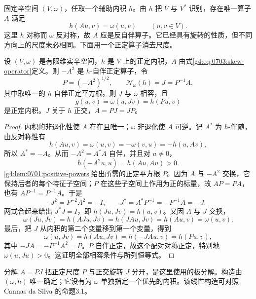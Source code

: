 固定辛空间 \((V,\omega)\)，任取一个辅助内积 \(h\)。由 \(h\) 把 \(V\) 与 \(V^*\) 识别，存在唯一算子 \(A\) 满足
\begin{equation}\label{g4:eq:0703:skew-operator}
	h(Au,v)=\omega(u,v)\qquad(u,v\in V).
\end{equation}
这里 \(h\) 对称而 \(\omega\) 反对称，故 \(A\) 应是反自伴算子。它已经具有旋转的性质，但不同方向上的尺度未必相同。下面用一个正定算子消去尺度。

\begin{theorem}\label{g4:thm:0703:polar-construction}
	设 \((V,\omega)\) 是有限维实辛空间，\(h\) 是 \(V\) 上的正定内积，\(A\) 由式\eqref{g4:eq:0703:skew-operator}定义。则 \(-A^2\) 是 \(h\)-自伴正定算子，令
	\begin{equation}\label{g4:eq:0703:normalization}
		P=(-A^2)^{1/2},\qquad
		\mathcal N_\omega(h)=J=P^{-1}A,
	\end{equation}
	其中取唯一的 \(h\)-自伴正定平方根。则 \(J\) 与 \(\omega\) 相容，且
	\begin{equation}\label{g4:eq:0703:normalized-metric}
		g(u,v)=\omega(u,Jv)=h(Pu,v)
	\end{equation}
	是正定内积。\(J\) 关于 \(h\) 正交，\(A=PJ=JP\)。
\end{theorem}
\begin{proof}
	内积的非退化性使 \(A\) 存在且唯一；\(\omega\) 非退化使 \(A\) 可逆。记 \(A^*\) 为 \(h\)-伴随，由反对称性有
	\[
		h(Au,v)=\omega(u,v)=-\omega(v,u)=-h(u,Av),
	\]
	所以 \(A^*=-A\)。从而 \(-A^2=A^*A\) 自伴，并且对 \(u\ne0\)，
	\[
		h(-A^2u,u)=h(Au,Au)>0.
	\]
	\cref{g4:lem:0701:positive-powers}给出所需的正定平方根 \(P\)。因为 \(A\) 与 \(-A^2\) 交换，它保持后者的每个特征子空间；\(P\) 在这些子空间上作用为正的标量，故 \(AP=PA\)，也有 \(AP^{-1}=P^{-1}A\)。于是
	\[
		J^2=P^{-2}A^2=-I,
		\qquad J^*=A^*P^{-1}=-P^{-1}A=-J.
	\]
	两式合起来给出 \(J^*J=I\)，即 \(h(Ju,Jv)=h(u,v)\)。又因 \(A\) 与 \(J\) 交换，
	\[
		\omega(Ju,Jv)=h(AJu,Jv)=h(JAu,Jv)=h(Au,v)=\omega(u,v).
	\]
	最后，把 \(J\) 从内积的第二个变量移到第一个变量，得到
	\[
		\omega(u,Jv)=h(Au,Jv)=h(-JAu,v)=h(Pu,v),
	\]
	其中 \(-JA=-P^{-1}A^2=P\)。\(P\) 自伴正定，故这个配对对称正定，特别地 \(\omega(u,Ju)>0\)。这证明全部相容条件与所列恒等式。
\end{proof}

分解 \(A=PJ\) 把正定尺度 \(P\) 与正交旋转 \(J\) 分开，是这里使用的极分解。构造由 \((\omega,h)\) 唯一确定；它没有为 \(\omega\) 单独指定一个优先的内积。该线性构造可对照 Cannas da Silva 的命题3.1。\cite[第3.1节，第108--109页]{Cannas2006Symplectic}

